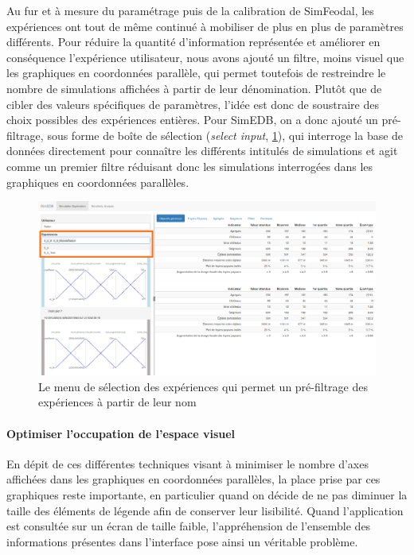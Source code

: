 			Au fur et à mesure du paramétrage puis de la calibration de SimFeodal, les expériences ont tout de même continué à mobiliser de plus en plus de paramètres différents.
			Pour réduire la quantité d'information représentée et améliorer en conséquence \og l'expérience utilisateur\fg{}, nous avons ajouté un filtre, moins visuel que les graphiques en coordonnées parallèle, qui permet toutefois de restreindre le nombre de simulations affichées à partir de leur dénomination.
			Plutôt que de cibler des valeurs spécifiques de paramètres, l'idée est donc de soustraire des choix possibles des expériences entières.
			Pour SimEDB, on a donc ajouté un pré-filtrage, sous forme de \og boîte de sélection\fg{} (\textit{select input}, \cref{fig:simedb-prefilter}), qui interroge la base de données directement pour connaître les différents intitulés de simulations et agit comme un premier filtre réduisant donc les simulations interrogées dans les graphiques en coordonnées parallèles.

			\begin{figure}[H]
				\centering
				\includegraphics[width=\linewidth]{img/SimEDB_prefiltrage.png}
				\caption{Le menu de sélection des expériences qui permet un pré-filtrage des expériences à partir de leur nom}
				\label{fig:simedb-prefilter}
			\end{figure}
			
			\paragraph*{Optimiser l'occupation de l'espace visuel}
			
			En dépit de ces différentes techniques visant à minimiser le nombre d'axes affichées dans les graphiques en coordonnées parallèles, la place prise par ces graphiques reste importante, en particulier quand on décide de ne pas diminuer la taille des éléments de légende afin de conserver leur lisibilité.
			Quand l'application est consultée sur un écran de taille faible, l'appréhension de l'ensemble des informations présentes dans l'interface pose ainsi un véritable problème.
			
